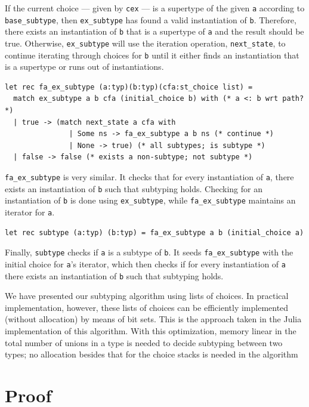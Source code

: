 \documentclass[a4paper,english]{lipics-v2018}
\begin{document}
If the current choice --- given by \verb|cex| --- is a supertype of the given \verb|a| according
to \verb|base_subtype|, then \verb|ex_subtype| has found a valid instantiation of \verb|b|. Therefore,
there exists an instantiation of \verb|b| that is a supertype of \verb|a| and the result should be true.
Otherwise, \verb|ex_subtype| will use the iteration operation, \verb|next_state|, to continue iterating
through choices for \verb|b| until it either finds an instantiation that is a supertype or runs out
of instantiations.

\begin{verbatim}
let rec fa_ex_subtype (a:typ)(b:typ)(cfa:st_choice list) =
  match ex_subtype a b cfa (initial_choice b) with (* a <: b wrt path? *)
  | true -> (match next_state a cfa with
               | Some ns -> fa_ex_subtype a b ns (* continue *)
               | None -> true) (* all subtypes; is subtype *)
  | false -> false (* exists a non-subtype; not subtype *)
\end{verbatim}

\verb|fa_ex_subtype| is very similar. It checks that for every
instantiation of \verb|a|, there exists an instantiation of 
\verb|b| such that subtyping holds. Checking for an instantiation
of \verb|b| is done using \verb|ex_subtype|, while \verb|fa_ex_subtype|
maintains an iterator for \verb|a|.

\begin{verbatim}
let rec subtype (a:typ) (b:typ) = fa_ex_subtype a b (initial_choice a)
\end{verbatim}

Finally, \verb|subtype| checks if \verb|a| is a subtype of \verb|b|.
It seeds \verb|fa_ex_subtype| with the initial choice for \verb|a|'s
iterator, which then checks if for every instantiation of \verb|a|
there exists an instantiation of \verb|b| such that subtyping holds.

We have presented our subtyping algorithm using lists of choices. In practical
implementation, however, these lists of choices can be efficiently implemented
(without allocation) by means of bit sets. This is the approach taken in the Julia
implementation of this algorithm. With this optimization, memory linear in the
total number of unions in a type is needed to decide subtyping between two types;
no allocation besides that for the choice stacks is needed in the algorithm

\section{Proof}
\end{document}
